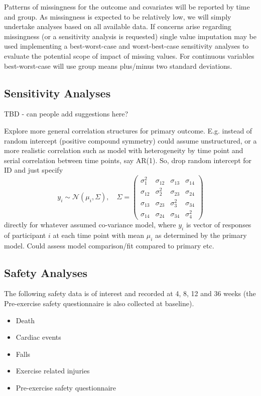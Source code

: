 \documentclass[
]{article}
\begin{document}
Patterns of missingness for the outcome and covariates will be reported by time and group.
As missingness is expected to be relatively low, we will simply undertake analyses based on all available data.
If concerns arise regarding missingness (or a sensitivity analysis is requested) single value imputation may be used implementing a best-worst-case and worst-best-case sensitivity analyses to evaluate the potential scope of impact of missing values.
For continuous variables best-worst-case will use group means plus/minus two standard deviations.

\hypertarget{sensitivity-analyses}{%
\subsection{Sensitivity Analyses}\label{sensitivity-analyses}}

TBD - can people add suggestions here?

Explore more general correlation structures for primary outcome.
E.g. instead of random intercept (positive compound symmetry) could assume unstructured, or a more realistic correlation such as model with heterogeneity by time point and serial correlation between time points, say AR(1). So, drop random intercept for ID and just specify
$$
y_i \sim \mathcal{N}(\mu_i, \Sigma),\quad
\Sigma = \begin{pmatrix}
\sigma_{1}^2 & \sigma_{12} & \sigma_{13} & \sigma_{14} \\
\sigma_{12} & \sigma_2^2 & \sigma_{23} & \sigma_{24} \\
\sigma_{13} & \sigma_{23} & \sigma_3^2 & \sigma_{34} \\
\sigma_{14} & \sigma_{24} & \sigma_{34} & \sigma_{4}^2
\end{pmatrix}
$$
directly for whatever assumed co-variance model, where $y_i$ is vector of responses of participant $i$ at each time point with mean $\mu_i$ as determined by the primary model. Could assess model comparison/fit compared to primary etc.

\hypertarget{safety-analyses}{%
\subsection{Safety Analyses}\label{safety-analyses}}

The following safety data is of interest and recorded at 4, 8, 12 and 36 weeks (the Pre-exercise safety questionnaire is also collected at baseline).

\begin{itemize}
\item Death
\item Cardiac events
\item Falls
\item Exercise related injuries
\item Pre-exercise safety questionnaire
\end{itemize}
\end{document}
